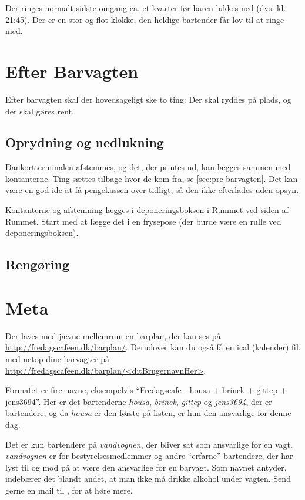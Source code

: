 Der ringes normalt sidste omgang ca. et kvarter før baren lukkes ned
(dvs. kl. 21:45). Der er en stor og flot klokke, den heldige bartender
får lov til at ringe med.

\section{Efter Barvagten}
\label{sec:post-barvagten}

Efter barvagten skal der hovedsageligt ske to ting: Der skal ryddes på
plads, og der skal gøres rent.

\subsection{Oprydning og nedlukning}
\label{sec:post:oprydning}

Dankortterminalen afstemmes, og det, der printes ud, kan lægges sammen
med kontanterne. Ting sættes tilbage hvor de kom fra, se
\autoref{sec:pre-barvagten}. Det kan være en god ide at få pengekassen
over tidligt, så den ikke efterlades uden opsyn.

Kontanterne og afstemning lægges i deponeringsboksen i Rummet ved
siden af Rummet. Start med at lægge det i en frysepose (der burde være
en rulle ved deponeringsboksen).

\subsection{Rengøring}
\label{sec:post:rengoring}


\section{Meta}
\label{sec:meta}

Der laves med jævne mellemrum en barplan, der kan ses på
\url{http://fredagscafeen.dk/barplan/}. Derudover kan du også få en
ical (kalender) fil, med netop dine barvagter på
\url{http://fredagscafeen.dk/barplan/<ditBrugernavnHer>}.

Formatet er fire navne, eksempelvis ``Fredagscafe - housa + brinck +
gittep + jens3694''. Her er det bartenderne \emph{housa},
\emph{brinck}, \emph{gittep} og \emph{jens3694}, der er bartendere, og
da \emph{housa} er den første på listen, er hun den ansvarlige for
denne dag.

Det er kun bartendere på \emph{vandvognen}, der bliver sat som
ansvarlige for en vagt. \emph{vandvognen} er for bestyrelsesmedlemmer
og andre ``erfarne'' bartendere, der har lyst til og mod på at være
den ansvarlige for en barvagt. Som navnet antyder, indebærer det
blandt andet, at man ikke må drikke alkohol under vagten. Send gerne
en mail til , for at høre mere.

